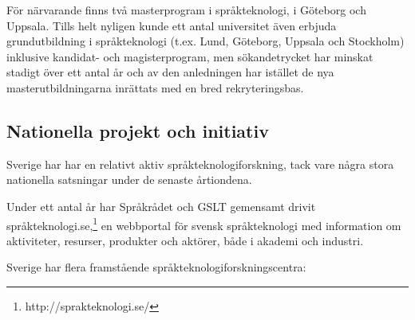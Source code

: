 \begin{multicols}{2}
För närvarande finns två masterprogram i språkteknologi, i Göteborg
och Uppsala. Tills helt nyligen kunde ett antal universitet även
erbjuda grundutbildning i språkteknologi (t.ex. Lund, Göteborg,
Uppsala och Stockholm) inklusive kandidat- och magisterprogram, men
sökandetrycket har minskat stadigt över ett antal år och av den
anledningen har istället de nya masterutbildningarna inrättats med en
bred rekryteringsbas.


\subsection{Nationella projekt och initiativ}

Sverige har har en relativt aktiv språkteknologiforskning, tack vare
några stora nationella satsningar under de senaste årtiondena.

Under ett antal år har Språkrådet och GSLT gemensamt drivit
språkteknologi.se,\footnote{http://sprakteknologi.se/} en webbportal
för svensk språkteknologi med information om aktivi\-teter, resurser,
produkter och aktörer, både i akademi och industri.

Sverige har flera framstående språkteknologi\-forsknings\-centra:


\end{multicols}
